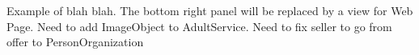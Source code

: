 \label{fig:ldviews}
Example of blah blah. The bottom right panel will be replaced by a view for Web Page. Need to add ImageObject to AdultService. Need to fix seller to go from offer to PersonOrganization